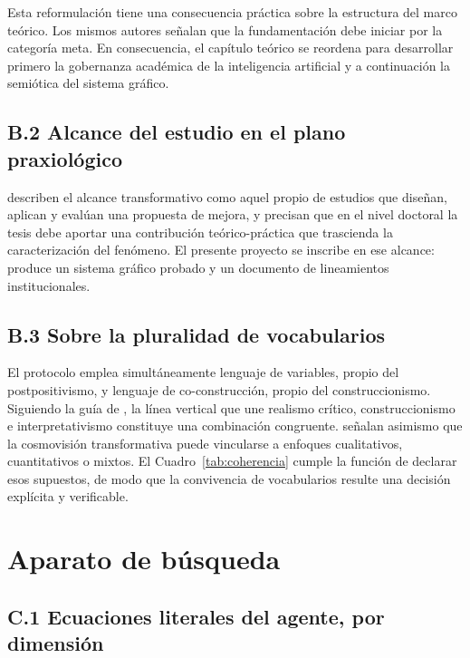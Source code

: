 \documentclass[letter,12pt]{article}
\begin{document}
Esta reformulación tiene una consecuencia práctica sobre la estructura del marco teórico. Los mismos autores señalan que la fundamentación debe iniciar por la categoría meta. En consecuencia, el capítulo teórico se reordena para desarrollar primero la gobernanza académica de la inteligencia artificial y a continuación la semiótica del sistema gráfico.

\subsection*{B.2 Alcance del estudio en el plano praxiológico}

\citet{deroncele2021} describen el alcance transformativo como aquel propio de estudios que diseñan, aplican y evalúan una propuesta de mejora, y precisan que en el nivel doctoral la tesis debe aportar una contribución teórico-práctica que trascienda la caracterización del fenómeno. El presente proyecto se inscribe en ese alcance: produce un sistema gráfico probado y un documento de lineamientos institucionales.

\subsection*{B.3 Sobre la pluralidad de vocabularios}

El protocolo emplea simultáneamente lenguaje de variables, propio del postpositivismo, y lenguaje de co-construcción, propio del construccionismo. Siguiendo la guía de \citet{moonblackman2014}, la línea vertical que une realismo crítico, construccionismo e interpretativismo constituye una combinación congruente. \citet{creswell2023} señalan asimismo que la cosmovisión transformativa puede vincularse a enfoques cualitativos, cuantitativos o mixtos. El Cuadro~\ref{tab:coherencia} cumple la función de declarar esos supuestos, de modo que la convivencia de vocabularios resulte una decisión explícita y verificable.

\section{Aparato de búsqueda}\label{anx:busqueda}

\subsection*{C.1 Ecuaciones literales del agente, por dimensión}
\end{document}
